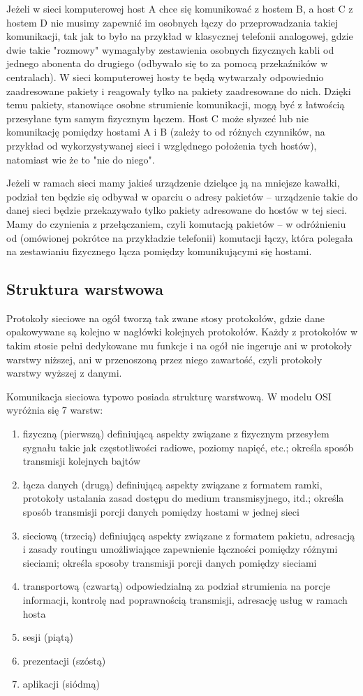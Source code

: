 Jeżeli w sieci komputerowej host A chce się komunikować z hostem B, a host C z hostem D nie musimy zapewnić im osobnych łączy do przeprowadzania takiej komunikacji, tak jak to było na przykład w klasycznej telefonii analogowej, gdzie dwie takie "rozmowy" wymagałyby zestawienia osobnych fizycznych kabli od jednego abonenta do drugiego (odbywało się to za pomocą przekaźników w centralach). W sieci komputerowej hosty te będą wytwarzały odpowiednio zaadresowane pakiety i reagowały tylko na pakiety zaadresowane do nich. Dzięki temu pakiety, stanowiące osobne strumienie komunikacji, mogą być z łatwością przesyłane tym samym fizycznym łączem. Host C może słyszeć lub nie komunikację pomiędzy hostami A i B (zależy to od różnych czynników, na przykład od wykorzystywanej sieci i względnego położenia tych hostów), natomiast wie że to "nie do niego". 

Jeżeli w ramach sieci mamy jakieś urządzenie dzielące ją na mniejsze kawałki, podział ten będzie się odbywał w oparciu o adresy pakietów – urządzenie takie do danej sieci będzie przekazywało tylko pakiety adresowane do hostów w tej sieci. Mamy do czynienia z przełączaniem, czyli komutacją pakietów – w odróżnieniu od (omówionej pokrótce na przykładzie telefonii) komutacji łączy, która polegała na zestawianiu fizycznego łącza pomiędzy komunikującymi się hostami.

\subsection{Struktura warstwowa}

Protokoły sieciowe na ogół tworzą tak zwane stosy protokołów, gdzie dane opakowywane są kolejno w nagłówki kolejnych protokołów. Każdy z protokołów w takim stosie pełni dedykowane mu funkcje i na ogół nie ingeruje ani w protokoły warstwy niższej, ani w przenoszoną przez niego zawartość, czyli protokoły warstwy wyższej z danymi.

Komunikacja sieciowa typowo posiada strukturę warstwową. W modelu OSI wyróżnia się 7 warstw:
\begin{enumerate}
	\item fizyczną (pierwszą) definiującą aspekty związane z fizycznym przesyłem sygnału takie jak częstotliwości radiowe, poziomy napięć, etc.;
		określa sposób transmisji kolejnych bajtów
	\item łącza danych (drugą) definiującą aspekty związane z formatem ramki, protokoły ustalania zasad dostępu do medium transmisyjnego, itd.;
		określa sposób transmisji porcji danych pomiędzy hostami w jednej sieci
	\item sieciową (trzecią) definiującą aspekty związane z formatem pakietu, adresacją i zasady routingu umożliwiające zapewnienie łączności pomiędzy różnymi sieciami;
		określa sposoby transmisji porcji danych pomiędzy sieciami
	\item transportową (czwartą) odpowiedzialną za podział strumienia na porcje informacji, kontrolę nad poprawnością transmisji, adresację usług w ramach hosta
	\item sesji (piątą)
	\item prezentacji (szóstą)
	\item aplikacji (siódmą)
\end{enumerate}

